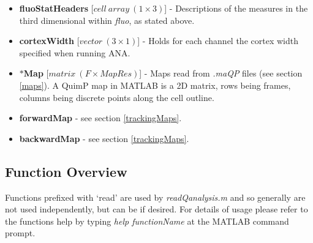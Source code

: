 \documentclass[a4paper,12pt]{article}
\begin{document}
\begin{itemize}
  \item \textbf{fluoStatHeaders} [$cell~array~(1\times3)$] - Descriptions of the measures in the third dimensional
  within \textit{fluo}, as stated above.
  
  \item \textbf{cortexWidth} [$vector~(3\times1)$] - Holds for each channel the cortex width specified when running ANA. 
  
   \item \textbf{$\ast$Map} [$matrix~(F\times MapRes)$] - Maps read from \textit{.maQP} files (see section \ref{maps}).  A QuimP map 
   in MATLAB is a 2D matrix, rows being frames, columns being discrete points along the cell outline.

  \item \textbf{forwardMap} - see section \ref{trackingMaps}.
  
  \item \textbf{backwardMap} - see section \ref{trackingMaps}.
     
\end{itemize}


\subsection{Function Overview}

Functions prefixed with `read'  are used by \textit{readQanalysis.m} and so generally are not used
independently, but can be if desired.    For details of usage please refer to the
functions help by typing \textit{help functionName} at the MATLAB command prompt.
\end{document}
